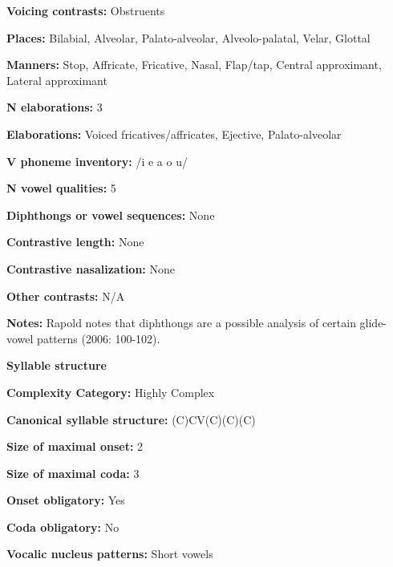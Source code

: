 \textbf{Voicing contrasts:} Obstruents



\textbf{Places:} Bilabial, Alveolar, Palato-alveolar, Alveolo-palatal, Velar, Glottal



\textbf{Manners:} Stop, Affricate, Fricative, Nasal, Flap/tap, Central approximant, Lateral approximant



\textbf{N elaborations:} 3



\textbf{Elaborations:} Voiced fricatives/affricates, Ejective, Palato-alveolar



\textbf{V phoneme inventory:} /i e a o u/



\textbf{N vowel qualities:} 5



\textbf{Diphthongs or vowel sequences:} None



\textbf{Contrastive length:} None



\textbf{Contrastive nasalization:} None



\textbf{Other contrasts:} N/A



\textbf{Notes:} Rapold notes that diphthongs are a possible analysis of certain glide-vowel patterns (2006: 100-102).



\textbf{Syllable structure}



\textbf{Complexity Category:} Highly Complex



\textbf{Canonical syllable structure:} (C)CV(C)(C)(C) \citep[91-112]{Rapold2006}



\textbf{Size of maximal onset:} 2



\textbf{Size of maximal coda:} 3



\textbf{Onset obligatory:} Yes



\textbf{Coda obligatory:} No



\textbf{Vocalic nucleus patterns:} Short vowels



